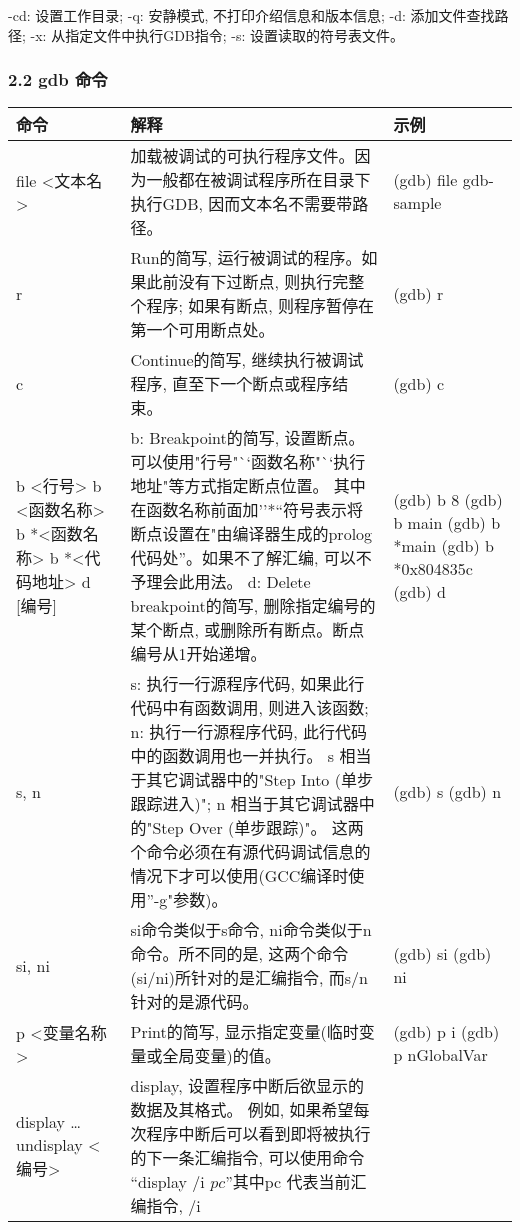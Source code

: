 \documentclass[
]{article}
\begin{document}
-cd: 设置工作目录; -q: 安静模式, 不打印介绍信息和版本信息; -d:
添加文件查找路径; -x: 从指定文件中执行GDB指令; -s:
设置读取的符号表文件。

\hypertarget{22-gdb-ux547dux4ee4}{%
\subsubsection{2.2 gdb 命令}\label{22-gdb-ux547dux4ee4}}

\begin{longtable}[]{@{}lll@{}}
\toprule()
命令 & 解释 & 示例 \\
\midrule()
\endhead
file \textless 文本名\textgreater{} &
加载被调试的可执行程序文件。因为一般都在被调试程序所在目录下执行GDB,
因而文本名不需要带路径。 & (gdb) file gdb-sample \\
r & Run的简写, 运行被调试的程序。如果此前没有下过断点, 则执行完整个程序;
如果有断点, 则程序暂停在第一个可用断点处。 & (gdb) r \\
c & Continue的简写, 继续执行被调试程序, 直至下一个断点或程序结束。 &
(gdb) c \\
b \textless 行号\textgreater{} b \textless 函数名称\textgreater{} b
*\textless 函数名称\textgreater{} b *\textless 代码地址\textgreater{} d
{[}编号{]} & b: Breakpoint的简写, 设置断点。
可以使用"行号"``函数名称"``执行地址"等方式指定断点位置。
其中在函数名称前面加''*``符号表示将断点设置在"由编译器生成的prolog代码处''。如果不了解汇编,
可以不予理会此用法。 d: Delete breakpoint的简写, 删除指定编号的某个断点,
或删除所有断点。断点编号从1开始递增。 & (gdb) b 8 (gdb) b main (gdb) b
*main (gdb) b *0x804835c (gdb) d \\
s, n & s: 执行一行源程序代码, 如果此行代码中有函数调用, 则进入该函数; n:
执行一行源程序代码, 此行代码中的函数调用也一并执行。 s
相当于其它调试器中的"Step Into (单步跟踪进入)"; n
相当于其它调试器中的"Step Over (单步跟踪)"。
这两个命令必须在有源代码调试信息的情况下才可以使用(GCC编译时使用''-g"参数)。
& (gdb) s (gdb) n \\
si, ni & si命令类似于s命令, ni命令类似于n命令。所不同的是,
这两个命令(si/ni)所针对的是汇编指令, 而s/n针对的是源代码。 & (gdb) si
(gdb) ni \\
p \textless 变量名称\textgreater{} & Print的简写,
显示指定变量(临时变量或全局变量)的值。 & (gdb) p i (gdb) p nGlobalVar \\
display \ldots{} undisplay \textless 编号\textgreater{} & display,
设置程序中断后欲显示的数据及其格式。 例如,
如果希望每次程序中断后可以看到即将被执行的下一条汇编指令, 可以使用命令
``display /i \(pc” 其中 \)pc 代表当前汇编指令, /i

\end{longtable}
\end{document}
